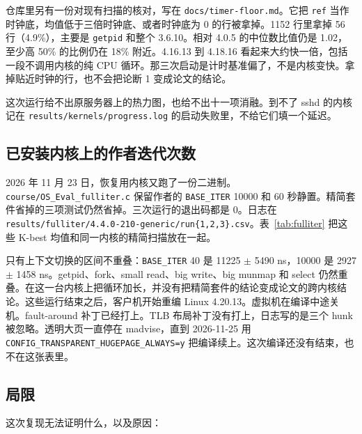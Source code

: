 \documentclass[11pt,fontset=none]{ctexart}
\begin{document}
仓库里另有一份对现有扫描的核对，写在 \texttt{docs/timer-floor.md}。它把 \texttt{ref} 当作时钟底，均值低于三倍时钟底、或者时钟底为 0 的行被拿掉。1152 行里拿掉 56 行（4.9\%），主要是 \texttt{getpid} 和整个 3.6.10。相对 4.0.5 的中位数比值仍是 1.02，至少高 50\% 的比例仍在 18\% 附近。4.16.13 到 4.18.16 看起来大约快一倍，包括一段不调用内核的纯 CPU 循环。那三次启动是计时基准偏了，不是内核变快。拿掉贴近时钟的行，也不会把论断 1 变成论文的结论。

这次运行给不出原服务器上的热力图，也给不出十一项消融。到不了 sshd 的内核记在 \texttt{results/kernels/progress.log} 的启动失败里，不给它们填一个延迟。

\subsection{已安装内核上的作者迭代次数}

2026 年 11 月 23 日，恢复用内核又跑了一份二进制。\texttt{course/OS\_Eval\_fulliter.c} 保留作者的 \texttt{BASE\_ITER} 10000 和 60 秒静置。精简套件省掉的三项测试仍然省掉。三次运行的退出码都是 0。日志在 \texttt{results/fulliter/4.4.0-210-generic/run\{1,2,3\}.csv}。表~\ref{tab:fulliter} 把这些 K-best 均值和同一内核的精简扫描放在一起。

\begin{table}[ht]
\centering
\caption{同一内核、两种迭代次数。每格是三次 K-best 的均值 $\pm$ 样本标准差。}
\label{tab:fulliter}

\end{table}

只有上下文切换的区间不重叠：\texttt{BASE\_ITER} 40 是 11225 $\pm$ 5490 ns，10000 是 2927 $\pm$ 1458 ns。getpid、fork、small read、big write、big munmap 和 select 仍然重叠。在这一台内核上把循环加长，并没有把精简套件的结论变成论文的跨内核结论。这些运行结束之后，客户机开始重编 Linux 4.20.13。虚拟机在编译中途关机。fault-around 补丁已经打上。TLB 布局补丁没有打上，日志写的是三个 hunk 被忽略。透明大页一直停在 madvise，直到 2026-11-25 用 \texttt{CONFIG\_TRANSPARENT\_HUGEPAGE\_ALWAYS=y} 把编译续上。这次编译还没有结束，也不在这张表里。

\subsection{局限}
\label{sec:limitations}

这次复现无法证明什么，以及原因：
\end{document}
